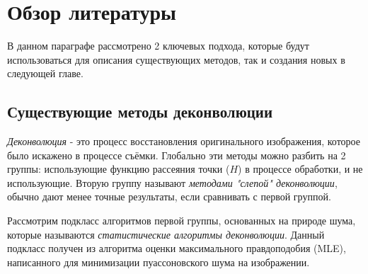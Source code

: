 \section{Обзор литературы} \label{ch1:sec2}
\par В данном параграфе рассмотрено 2 ключевых подхода, которые будут использоваться для описания существующих методов, так и создания новых в следующей главе.
\subsection{Существующие методы деконволюции} 
\par \textit{Деконволюция} - это процесс восстановления оригинального изображения, которое было искажено в процессе съёмки. Глобально эти методы можно разбить на 2 группы: использующие функцию рассеяния точки ($H$) в процессе обработки, и не использующие. Вторую группу называют \textit{методами "слепой" деконволюции}, обычно дают менее точные результаты, если сравнивать с первой группой.
\par Рассмотрим подкласс алгоритмов первой группы, основанных на природе шума, которые называются \textit{статистические алгоритмы деконволюции}. Данный подкласс получен из алгоритма оценки максимального правдоподобия (MLE), написанного для минимизации пуассоновского шума на изображении. 

